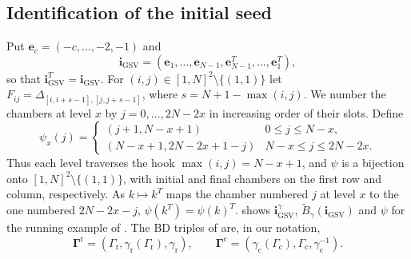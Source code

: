 \documentclass[a4paper]{amsart}
\numberwithin{equation}{section}
\theoremstyle{definition}
\theoremstyle{remark}
\newcommand{\bfi}{\mathbf{i}}
\newcommand{\tB}{\widetilde{B}}
\newcommand{\rr}{\mathrm{r}}
\newcommand{\cc}{\mathrm{c}}
\begin{document}
\subsection{Identification of the initial seed}
\label{sec: base case}
Put $\mathbf e_c=(-c,\dots,-2,-1)$ and
\[
  \bfi_\mathrm{GSV}=(\mathbf e_1,\dots,\mathbf e_{N-1},\mathbf e_{N-1}^T,\dots,\mathbf e_1^T),
\]
so that $\bfi_\mathrm{GSV}^T=\bfi_\mathrm{GSV}$.
For $(i,j)\in[1,N]^2\setminus\{(1,1)\}$ let $F_{ij}=\Delta_{[i,i+s-1],[j,j+s-1]}$, where $s=N+1-\max(i,j)$.
We number the chambers at level $x$ by $j=0,\dots,2N-2x$ in increasing order of their slots.
Define
\begin{equation}
  \label{eq: psi}
  \psi_x(j)=
  \begin{cases}
    (j+1,N-x+1)&0\le j\le N-x,\\
    (N-x+1,2N-2x+1-j)&N-x\le j\le2N-2x.
  \end{cases}
\end{equation}
Thus each level traverses the hook $\max(i,j)=N-x+1$, and $\psi$ is a bijection onto $[1,N]^2\setminus\{(1,1)\}$, with initial and final chambers on the first row and column, respectively.
As $k\mapsto k^T$ maps the chamber numbered $j$ at level $x$ to the one numbered $2N-2x-j$, $\psi(k^T)=\psi(k)^T$.
 shows $\bfi_\mathrm{GSV}^\gamma$, $\tB_\gamma(\bfi_\mathrm{GSV})$ and $\psi$ for the running example of \cite{GSV23}.
The BD triples of \cite{GSV23} are, in our notation,
\[
  \mathbf\Gamma^\rr=(\Gamma_{\rr},\gamma_{\rr}(\Gamma_{\rr}),\gamma_{\rr}),\qquad
  \mathbf\Gamma^\cc=(\gamma_{\cc}(\Gamma_{\cc}),\Gamma_{\cc},\gamma_{\cc}^{-1}).
\]
\end{document}
